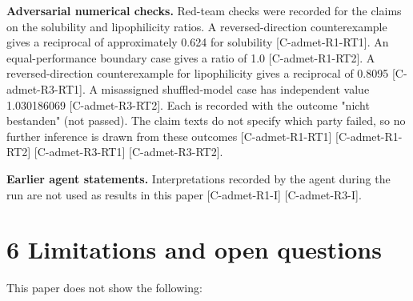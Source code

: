 \documentclass[10pt,twocolumn]{article}
\begin{document}
\textbf{Adversarial numerical checks.} Red-team checks were recorded for the claims on the solubility and lipophilicity ratios. A reversed-direction counterexample gives a reciprocal of approximately 0.624 for solubility {\scriptsize[C-admet-R1-RT1]}. An equal-performance boundary case gives a ratio of 1.0 {\scriptsize[C-admet-R1-RT2]}. A reversed-direction counterexample for lipophilicity gives a reciprocal of 0.8095 {\scriptsize[C-admet-R3-RT1]}. A misassigned shuffled-model case has independent value 1.030186069 {\scriptsize[C-admet-R3-RT2]}. Each is recorded with the outcome "nicht bestanden" (not passed). The claim texts do not specify which party failed, so no further inference is drawn from these outcomes {\scriptsize[C-admet-R1-RT1]} {\scriptsize[C-admet-R1-RT2]} {\scriptsize[C-admet-R3-RT1]} {\scriptsize[C-admet-R3-RT2]}.

\textbf{Earlier agent statements.} Interpretations recorded by the agent during the run are not used as results in this paper {\scriptsize[C-admet-R1-I]} {\scriptsize[C-admet-R3-I]}.

\section{6 Limitations and open questions}

This paper does not show the following:
\end{document}
